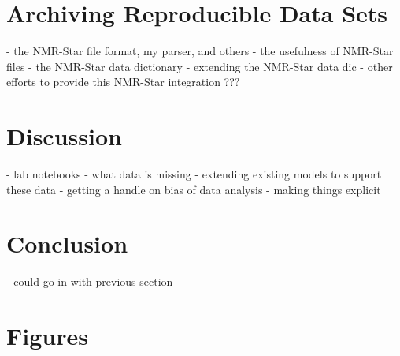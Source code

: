 \section{Archiving Reproducible Data Sets}
 - the NMR-Star file format, my parser, and others
 - the usefulness of NMR-Star files
 - the NMR-Star data dictionary
 - extending the NMR-Star data dic
 - other efforts to provide this NMR-Star integration ???


\section{Discussion}
 - lab notebooks
 - what data is missing
 - extending existing models to support these data
 - getting a handle on bias of data analysis
 - making things explicit


\section{Conclusion}
 - could go in with previous section


\clearpage
\section{Figures}


